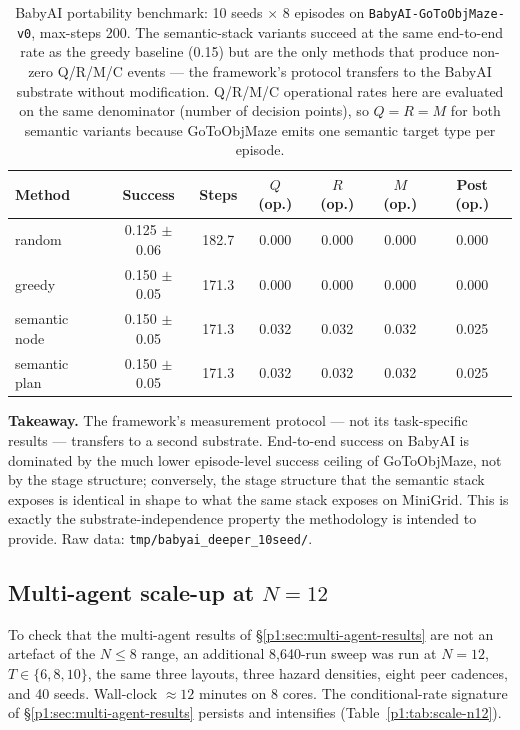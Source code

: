 \documentclass{article}
\begin{document}
\begin{table}[h]
\centering
\caption{BabyAI portability benchmark: 10 seeds $\times$ 8 episodes on \texttt{BabyAI-GoToObjMaze-v0}, max-steps 200. The semantic-stack variants succeed at the same end-to-end rate as the greedy baseline (0.15) but are the only methods that produce non-zero Q/R/M/C events --- the framework's protocol transfers to the BabyAI substrate without modification. Q/R/M/C operational rates here are evaluated on the same denominator (number of decision points), so $Q{=}R{=}M$ for both semantic variants because GoToObjMaze emits one semantic target type per episode.}
\label{p1:tab:babyai-deeper}
\small
\begin{tabular}{l c c c c c c}
\toprule
Method & Success & Steps & $Q$ (op.) & $R$ (op.) & $M$ (op.) & Post (op.) \\
\midrule
random         & 0.125 $\pm$ 0.06 & 182.7 & 0.000 & 0.000 & 0.000 & 0.000 \\
greedy         & 0.150 $\pm$ 0.05 & 171.3 & 0.000 & 0.000 & 0.000 & 0.000 \\
semantic node  & 0.150 $\pm$ 0.05 & 171.3 & 0.032 & 0.032 & 0.032 & 0.025 \\
semantic plan  & 0.150 $\pm$ 0.05 & 171.3 & 0.032 & 0.032 & 0.032 & 0.025 \\
\bottomrule
\end{tabular}
\end{table}

\textbf{Takeaway.} The framework's measurement protocol --- not its task-specific results --- transfers to a second substrate. End-to-end success on BabyAI is dominated by the much lower episode-level success ceiling of GoToObjMaze, not by the stage structure; conversely, the stage structure that the semantic stack exposes is identical in shape to what the same stack exposes on MiniGrid. This is exactly the substrate-independence property the methodology is intended to provide. Raw data: \texttt{tmp/babyai\_deeper\_10seed/}.

\subsection{Multi-agent scale-up at $N=12$}
\label{p1:app:scale-N12}

To check that the multi-agent results of \S\ref{p1:sec:multi-agent-results} are not an artefact of the $N\!\le\!8$ range, an additional 8{,}640-run sweep was run at $N\!=\!12$, $T \in \{6, 8, 10\}$, the same three layouts, three hazard densities, eight peer cadences, and 40 seeds. Wall-clock $\approx 12$ minutes on 8 cores. The conditional-rate signature of \S\ref{p1:sec:multi-agent-results} persists and intensifies (Table~\ref{p1:tab:scale-n12}).
\end{document}
